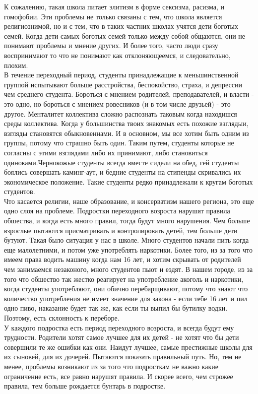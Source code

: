 \documentclass[12pt,a4paper]{article}
\begin{document}
К сожалению, такая школа питает элитизм в форме сексизма, расизма, и гомофобии. Эти проблемы не только связаны с тем,
что школа является религиознимой, но и с тем, что в таких частних школах учятся дети боготых семей. Когда дети самых боготых
семей только между собой общаются, они не понимают проблемы и мнение других. И более того, часто люди сразу
воспринимают то что не понимают как отклоняющеемся, и следовательно, плохим.\\

В течение переходный период, студенты принадлежащие к меньшинственной группой испытывают больше расстройства, беспокойство,
страха, и депрессии чем среднего студента. Бороться с мнением родителей, преподавателей, и власти - это одно,
но бороться с мнением ровесников (и в том числе друзьей) - это другое. Менталитет коллектива сложно распознать таковым
когда находишся среды коллектива. Когда у большинства твоих знакомых есть похожие взглядыи, взгляды становятся обыкновеннами.
И в основном, мы все хотим быть одним из группы, потому что страшно быть один. Таким путем, студенты которые не согласны
с этими взглядами либо их принимают, либо становиться одиноками.Чернокожые студенты всегда вместе сидели на обед, гей студенты
боялись совершать каминг-аут, и бедние студенты на стипенды скривались их экономическое положение. Такие студенты редко
принадлежали к кругам боготых студентов. \\

Что касается религии, наше образование, и консерватизм нашего региона, это еще одно слоя на проблеме. Подростки переходного возроста
нарушят правила обшества, и когда есть много правил, тогда будут много нарушения. Чем больше взрослые
пытаются присматривать и контролировать детей, тем больше дети бутуют. Такая было ситуация у нас в школе. Много студентов
начали пить когда еще малолетними, и потом уже употреблять наркотики. Более того, из за того что имеем права водить
машину когда нам 16 лет, и хотим скрывать от родителей чем занимаемся незаконого, много студентов пьют и ездят. В нашем городе,
из за того что обшество так жестко реагирует на употребление акоголь и наркотики, когда студенты употребляют, они обично
перебарщивают, потому что знают что количество употребления не имеет значение для закона - если тебе 16 лет и пил одно пиво,
наказание будет так же, как если ты выпил бы бутилку водки. Поэтому, есть склонность к переборе. \\


У каждого подростка есть период переходного возроста, и всегда будут ему трудности. Родители хотят самое лучшее для их детей - не хотят что бы дети совершили те же ошибки как они. Наидут лучшее, самые престижные школы для их сыновей, для их дочерей. Пытаются показать правильный путь. Но, тем не менее, проблемы возникают из за того что подросткам не важно какие ограничение есть, все равно нарушят правила. И скорее всего, чем строжее правила, тем больше рождается бунтарь в подростке. 
\end{document}
